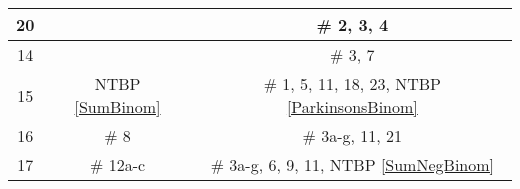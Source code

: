 \documentclass[12pt]{article}
\begin{document}
\begin{center}
\begin{tabular}{|c|c||c|}
\hline
20 &    & \# 2, 3, 4\\
\hline	
14  &   & \# 3, 7\\
\hline	
15 &  NTBP \ref{SumBinom}   & \# 1, 5, 11, 18, 23, NTBP \ref{ParkinsonsBinom}\\  
\hline	
16 & \# 8  & \# 3a-g, 11, 21\\
\hline	
17 & \# 12a-c  & \# 3a-g, 6, 9, 11, NTBP \ref{SumNegBinom}\\
\hline	


\hline

\end{tabular}
\end{center}




\end{document}
